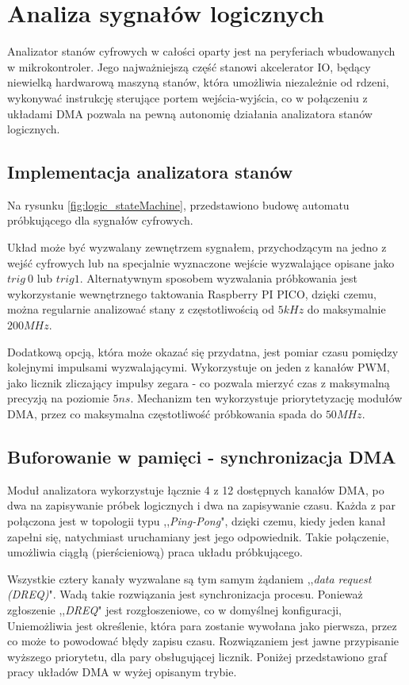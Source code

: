 \section{Analiza sygnałów logicznych}
    Analizator stanów cyfrowych w całości oparty jest na peryferiach wbudowanych w mikrokontroler.
    Jego najważniejszą część stanowi akcelerator IO, będący niewielką hardwarową maszyną stanów, 
    która umożliwia niezależnie od rdzeni, wykonywać instrukcję sterujące portem wejścia-wyjścia,
    co w połączeniu z układami DMA pozwala na pewną autonomię działania analizatora stanów logicznych.


\subsection{Implementacja analizatora stanów}
    Na rysunku \ref{fig:logic_stateMachine}, przedstawiono budowę automatu próbkującego dla sygnałów cyfrowych.

    

    Układ może być wyzwalany zewnętrzem sygnałem, przychodzącym na jedno z wejść cyfrowych lub na specjalnie wyznaczone wejście wyzwalające opisane jako $trig\ 0$ lub $trig 1$.
    Alternatywnym sposobem wyzwalania próbkowania jest wykorzystanie wewnętrznego taktowania Raspberry PI PICO, dzięki czemu, można regularnie analizować stany z częstotliwością od $5kHz$ do maksymalnie $200MHz$.

    Dodatkową opcją, która może okazać się przydatna, jest pomiar czasu pomiędzy kolejnymi impulsami wyzwalającymi.
    Wykorzystuje on jeden z kanałów PWM, jako licznik zliczający impulsy zegara - co pozwala mierzyć czas z maksymalną precyzją na poziomie $5ns$.
    Mechanizm ten wykorzystuje priorytetyzację modułów DMA, przez co maksymalna częstotliwość próbkowania spada do $50MHz$.


\subsection{Buforowanie w pamięci - synchronizacja DMA}
    Moduł analizatora wykorzystuje łącznie 4 z 12 dostępnych kanałów DMA, po dwa na zapisywanie próbek logicznych i dwa na zapisywanie czasu.
    Każda z par połączona jest w topologii typu ,,\textit{Ping-Pong}", dzięki czemu, kiedy jeden kanał zapełni się, natychmiast uruchamiany jest jego odpowiednik.
    Takie połączenie, umożliwia ciągłą (pierścieniową) praca układu próbkującego.

    Wszystkie cztery kanały wyzwalane są tym samym żądaniem ,,\textit{data request (DREQ)}".
    Wadą takie rozwiązania jest synchronizacja procesu.
    Ponieważ zgłoszenie ,,\textit{DREQ}" jest rozgłoszeniowe, co w domyślnej konfiguracji, Uniemożliwia jest określenie, która para zostanie wywołana jako pierwsza, przez co  może to powodować błędy zapisu czasu.
    Rozwiązaniem jest jawne przypisanie wyższego priorytetu, dla pary obsługującej licznik.
    Poniżej przedstawiono graf pracy układów DMA w wyżej opisanym trybie.
    
    




